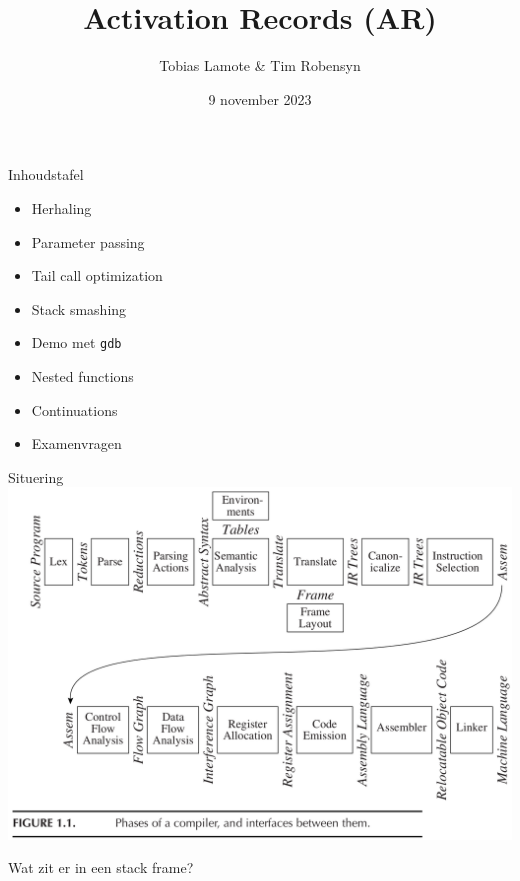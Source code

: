 \documentclass{beamer}
\title{Activation Records (AR)}
\author{Tobias Lamote \& Tim Robensyn}
\date{9 november 2023}
\begin{document}
\frame{\titlepage}

\begin{frame}{Inhoudstafel}
	\begin{itemize}
	    \item Herhaling
	    \item Parameter passing
	    \item Tail call optimization
	    \item Stack smashing
	    \item Demo met \texttt{gdb}
	    \item Nested functions
	    \item Continuations
	    \item Examenvragen
	\end{itemize}
\end{frame}

\begin{frame}{Situering}
    \includegraphics[width=\textwidth]{compiler_phases.png}
\end{frame}


\begin{frame}
    Wat zit er in een stack frame?
\end{frame}
\end{document}
